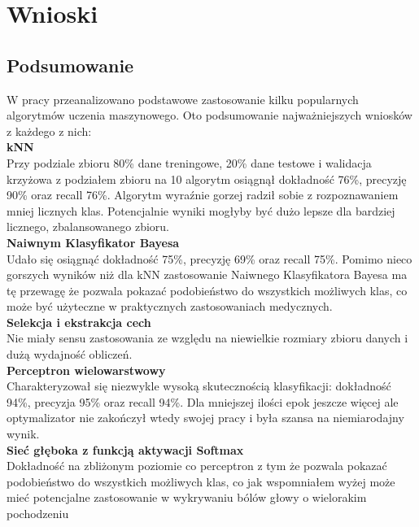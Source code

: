 \section{Wnioski}
\subsection{Podsumowanie}
W pracy przeanalizowano podstawowe zastosowanie kilku popularnych algorytmów uczenia maszynowego. Oto podsumowanie najważniejszych wniosków z każdego z nich:\\

\textbf{kNN}\\
Przy podziale zbioru 80\% dane treningowe, 20\% dane testowe i walidacja krzyżowa z podziałem zbioru na 10 algorytm osiągnął dokładność 76\%, precyzję 90\% oraz recall 76\%. Algorytm wyraźnie gorzej radził sobie z rozpoznawaniem mniej licznych klas. Potencjalnie wyniki mogłyby być dużo lepsze dla bardziej licznego, zbalansowanego zbioru.\\

\textbf{Naiwnym Klasyfikator Bayesa}\\
Udało się osiągnąć dokładność 75\%, precyzję 69\% oraz recall 75\%. Pomimo nieco gorszych wyników niż dla kNN zastosowanie Naiwnego Klasyfikatora Bayesa ma tę przewagę że pozwala pokazać podobieństwo do wszystkich możliwych klas, co może być użyteczne w praktycznych zastosowaniach medycznych.\\

\textbf{Selekcja i ekstrakcja cech}\\
Nie miały sensu zastosowania ze względu na niewielkie rozmiary zbioru danych i dużą wydajność obliczeń.\\

\textbf{Perceptron wielowarstwowy}\\
Charakteryzował się niezwykle wysoką skutecznością klasyfikacji: dokładność 94\%, precyzja 95\% oraz recall 94\%. Dla mniejszej ilości epok jeszcze więcej ale optymalizator nie zakończył wtedy swojej pracy i była szansa na niemiarodajny wynik.\\

\textbf{Sieć głęboka z funkcją aktywacji Softmax}\\
Dokładność na zbliżonym poziomie co perceptron z tym że pozwala pokazać podobieństwo do wszystkich możliwych klas, co jak wspomniałem wyżej może mieć potencjalne zastosowanie w wykrywaniu bólów głowy o wielorakim pochodzeniu\\

